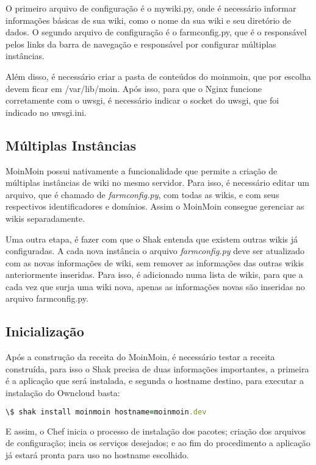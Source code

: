 O primeiro arquivo de configuração é o mywiki.py, onde é necessário
informar informações básicas de sua wiki, como o nome da sua wiki e seu diretório de dados. 
O segundo arquivo de configuração é o farmconfig.py, que é o responsável pelos 
links da barra de navegação e responsável por configurar múltiplas instâncias.

Além disso, é necessário criar a pasta de conteúdos do moinmoin, que por
escolha devem ficar em /var/lib/moin. Após isso, para que o Nginx funcione corretamente
com o uwsgi, é necessário indicar o socket do uwsgi, que foi indicado no uwsgi.ini.

\subsection{Múltiplas Instâncias}

MoinMoin possui nativamente a funcionalidade que permite a criação de múltiplas 
instâncias de wiki no mesmo servidor. Para isso, é necessário editar um arquivo,
que é chamado de \textit{farmconfig.py}, com todas as wikis, e com seus 
respectivos identificadores e domínios. Assim o MoinMoin consegue gerenciar as 
wikis separadamente. 

Uma outra etapa, é fazer com que o Shak entenda que existem outras wikis já 
configuradas. A cada nova instância
o arquivo \textit{farmconfig.py} deve ser atualizado com as novas 
informações de wiki, sem remover as
informações das outras wikis anteriormente inseridas. Para isso, é adicionado
numa lista de wikis, para que a cada vez que surja uma wiki nova, apenas as
informações novas são inseridas no arquivo farmconfig.py.

\subsection{Inicialização}

Após a construção da receita do MoinMoin, é necessário testar a receita construída,
para isso o Shak precisa de duas informações importantes, a primeira é a aplicação
que será instalada, e segunda o hostname destino, para executar a instalação
do Owncloud basta:

\begin{lstlisting}[language=Ruby,label=dice_index,caption={Exemplo de execução de instalação do owncloud com shak}]
\$ shak install moinmoin hostname=moinmoin.dev
\end{lstlisting}

E assim, o Chef inicia o processo de instalação dos pacotes; criação dos arquivos
de configuração; incia os serviços desejados; e ao fim do procedimento a aplicação
já estará pronta para uso no hostname escolhido.

